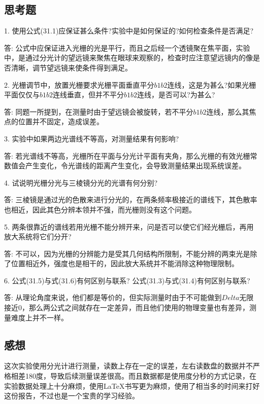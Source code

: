 \documentclass[a4paper]{article}
\begin{document}
\begin{changemargin}{1cm}{1cm}
    \subsection{思考题}
    \begin{spacing}{1.6}
        1. 使用公式(31.1)应保证甚么条件?实验中是如何保证的?如何检查条件是否满足?\par
        答: 公式中应保证进入光栅的光是平行，而且之后经一个透镜聚在焦平面，实验中，是通过分光计的望远镜来聚焦在眼球来观察的，检查时应注意望远镜内的像是否清晰，调节望远镜来使条件得到满足。\par
        2. 光栅调节中，放置光栅要求光栅平面垂直平分$b1b2$连线，这是为甚么?如果光栅平面仅仅与$b1b2$连线垂直，但并不平分$b1b2$连线，是否可以?为甚么?\par
        答: 同题一所提到，在测量时由于望远镜会被旋转，若不平分$b1b2$连线，那么其焦点的位置并不固定，造成误差。\par
        3. 实验中如果两边光谱线不等高，对测量结果有何影响?\par
        答: 若光谱线不等高，光栅所在平面与分光计平面有夹角，那么光栅的有效光栅常数值会产生变化，令光谱线的距离产生变化，会导致测量结果出现系统误差。\par
        4. 试说明光栅分光与三棱镜分光的光谱有何分别?\par
        答: 三棱镜是通过光的色散来进行分光的，在两条频率极接近的谱线下，其色散率也相近，因此其色分辨本领并不强，而光栅则没有这个问题。\par
        5. 两条很靠近的谱线若用光栅不能分辨开来，问是否可以使它们经光栅后，再用放大系统将它们分开?\par
        答: 不可以，因为光栅的分辨能力是受其几何结构所限制，不能分辨的两束光是除了位置相近外，强度也是相干的，因此放大系统并不能消除这种物理限制。\par
        6. 公式(31.5)与式(31.6)有何区别与联系? 公式(31.3)与式(31.4)有何区别与联系?\par
        答: 从理论角度来说，他们都是等价的，但实际测量时由于不可能做到$Delta$无限接近0，那么两公式之间就存在一定差异，而且他们使用的物理变量也有差异，测量难度上并不一样。\par    \end{spacing}

    \subsection{感想}
    \begin{spacing}{1.6}
        这次实验使用分光计进行测量，读数上存在一定的误差，左右读数盘的数据并不严格相差180度，导致后续测量误差很高。而且数据都是使用度分秒的方式记录，在实验数据处理上十分麻烦，使用LaTeX书写更为麻烦，使用了相当多的时间来打好这份报告，不过也是一个宝贵的学习经验。
    \end{spacing}










\end{changemargin}
\end{document}
